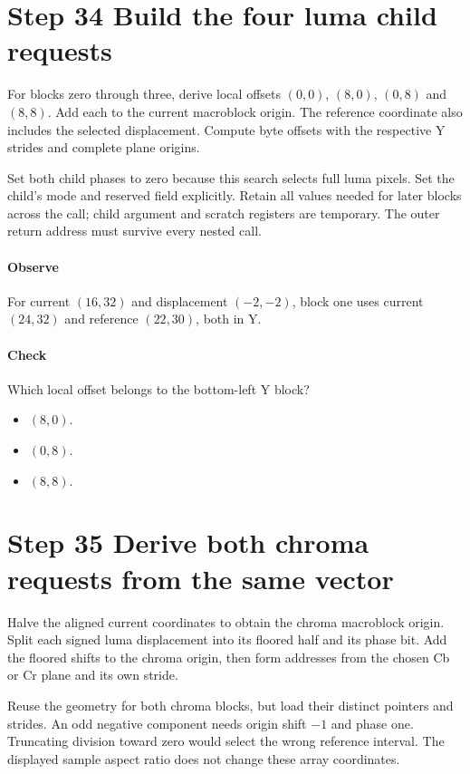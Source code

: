 \section{Step 34 Build the four luma child requests}\label{h263-macroblock-s04}
For blocks zero through three, derive local offsets $(0,0)$, $(8,0)$, $(0,8)$
and $(8,8)$. Add each to the current macroblock origin. The reference coordinate
also includes the selected displacement. Compute byte offsets with the respective
Y strides and complete plane origins.

Set both child phases to zero because this search selects full luma pixels.
Set the child's mode and reserved field explicitly. Retain all values needed for
later blocks across the call; child argument and scratch registers are temporary.
The outer return address must survive every nested call.

\paragraph{Observe} For current $(16,32)$ and displacement $(-2,-2)$, block one
uses current $(24,32)$ and reference $(22,30)$, both in Y.
\paragraph{Check} Which local offset belongs to the bottom-left Y block?
\begin{itemize}
  \item[A.] $(8,0)$.
  \item[B.] $(0,8)$.
  \item[C.] $(8,8)$.
\end{itemize}

\section{Step 35 Derive both chroma requests from the same vector}\label{h263-macroblock-s05}
Halve the aligned current coordinates to obtain the chroma macroblock origin.
Split each signed luma displacement into its floored half and its phase bit.
Add the floored shifts to the chroma origin, then form addresses from the chosen
Cb or Cr plane and its own stride.

Reuse the geometry for both chroma blocks, but load their distinct pointers and
strides. An odd negative component needs origin shift $-1$ and phase one.
Truncating division toward zero would select the wrong reference interval.
The displayed sample aspect ratio does not change these array coordinates.

